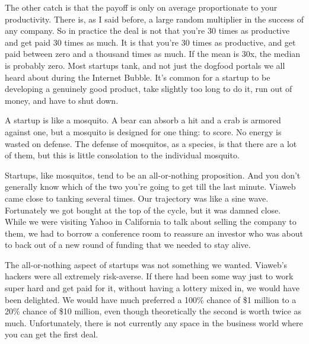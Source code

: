 The other catch is
                    that the payoff is only on average proportionate to your
                    productivity. There is, as I said before, a large random
                    multiplier in the success of any company. So in practice the
                    deal is not that you're 30 times as productive and get paid
                    30 times as much. It is that you're 30 times as productive,
                    and get paid between zero and a thousand times as much. If
                    the mean is 30x, the median is probably zero. Most startups
                    tank, and not just the dogfood portals we all heard about
                    during the Internet Bubble. It's common for a startup to be
                    developing a genuinely good product, take slightly too long
                    to do it, run out of money, and have to shut down.

A
                    startup is like a mosquito. A bear can absorb a hit and a
                    crab is armored against one, but a mosquito is designed for
                    one thing: to score. No energy is wasted on defense. The
                    defense of mosquitos, as a species, is that there are a lot
                    of them, but this is little consolation to the individual
                    mosquito.

Startups, like mosquitos, tend to be an
                    all-or-nothing proposition. And you don't generally know
                    which of the two you're going to get till the last minute.
                    Viaweb came close to tanking several times. Our trajectory
                    was like a sine wave. Fortunately we got bought at the top
                    of the cycle, but it was damned close. While we were
                    visiting Yahoo in California to talk about selling the
                    company to them, we had to borrow a conference room to
                    reassure an investor who was about to back out of a new
                    round of funding that we needed to stay alive.

The
                    all-or-nothing aspect of startups was not something we
                    wanted. Viaweb's hackers were all extremely risk-averse. If
                    there had been some way just to work super hard and get paid
                    for it, without having a lottery mixed in, we would have
                    been delighted. We would have much preferred a 100\% chance
                    of \$1 million to a 20\% chance of \$10 million, even though
                    theoretically the second is worth twice as much.
                    Unfortunately, there is not currently any space in the
                    business world where you can get the first deal.

